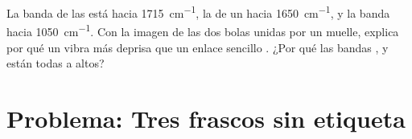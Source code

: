 \begin{exercise}[$\star\star\star$]\label{exo:g11:infrared:15}
La banda  de las  está hacia \qty{1715}{cm^{-1}}, la de
un  hacia \qty{1650}{cm^{-1}}, y la banda  hacia
\qty{1050}{cm^{-1}}. Con la imagen de las dos bolas unidas por un muelle,
explica por qué un   vibra más deprisa que un enlace
sencillo . ¿Por qué las bandas ,  y 
están todas a  altos?
\end{exercise}

\section{Problema: Tres frascos sin etiqueta}

